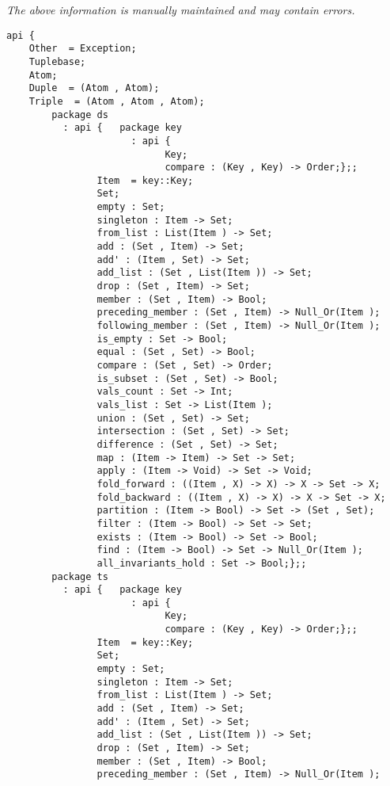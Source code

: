 \label{api:Tuplebase}

{\tiny \it The above information is manually maintained and may contain errors.}
\begin{verbatim}
api {
    Other  = Exception;
    Tuplebase;
    Atom;
    Duple  = (Atom , Atom);
    Triple  = (Atom , Atom , Atom);
        package ds
          : api {   package key
                      : api {
                            Key;
                            compare : (Key , Key) -> Order;};;
                Item  = key::Key;
                Set;
                empty : Set;
                singleton : Item -> Set;
                from_list : List(Item ) -> Set;
                add : (Set , Item) -> Set;
                add' : (Item , Set) -> Set;
                add_list : (Set , List(Item )) -> Set;
                drop : (Set , Item) -> Set;
                member : (Set , Item) -> Bool;
                preceding_member : (Set , Item) -> Null_Or(Item );
                following_member : (Set , Item) -> Null_Or(Item );
                is_empty : Set -> Bool;
                equal : (Set , Set) -> Bool;
                compare : (Set , Set) -> Order;
                is_subset : (Set , Set) -> Bool;
                vals_count : Set -> Int;
                vals_list : Set -> List(Item );
                union : (Set , Set) -> Set;
                intersection : (Set , Set) -> Set;
                difference : (Set , Set) -> Set;
                map : (Item -> Item) -> Set -> Set;
                apply : (Item -> Void) -> Set -> Void;
                fold_forward : ((Item , X) -> X) -> X -> Set -> X;
                fold_backward : ((Item , X) -> X) -> X -> Set -> X;
                partition : (Item -> Bool) -> Set -> (Set , Set);
                filter : (Item -> Bool) -> Set -> Set;
                exists : (Item -> Bool) -> Set -> Bool;
                find : (Item -> Bool) -> Set -> Null_Or(Item );
                all_invariants_hold : Set -> Bool;};;
        package ts
          : api {   package key
                      : api {
                            Key;
                            compare : (Key , Key) -> Order;};;
                Item  = key::Key;
                Set;
                empty : Set;
                singleton : Item -> Set;
                from_list : List(Item ) -> Set;
                add : (Set , Item) -> Set;
                add' : (Item , Set) -> Set;
                add_list : (Set , List(Item )) -> Set;
                drop : (Set , Item) -> Set;
                member : (Set , Item) -> Bool;
                preceding_member : (Set , Item) -> Null_Or(Item );

\end{verbatim}
